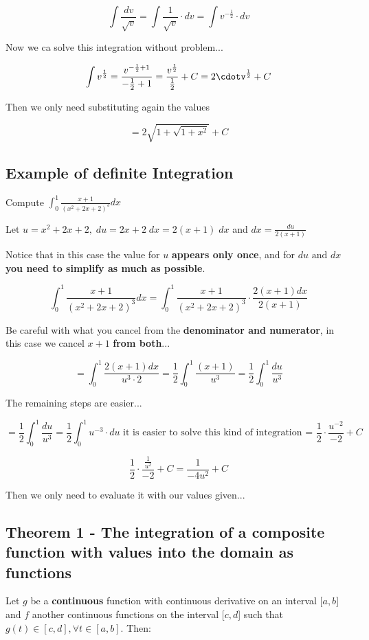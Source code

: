 \documentclass{article}
\begin{document}
\[\int \frac{dv}{\sqrt{v}} = \int \frac{1}{\sqrt{v}} \cdot dv = \int v^{-\frac{1}{2}} \cdot dv\]

Now we ca solve this integration without problem...

\[\int v^{\frac{1}{2}} = \frac{v^{-\frac{1}{2} + 1}}{-\frac{1}{2}+1} = \frac{v^{\frac{1}{2}}}{\frac{1}{2}} + C = 2\cdotv^{\frac{1}{2}} + C
\]

Then we only need substituting again the values

\[=2\sqrt{1+\sqrt{1+x^2}} + C\]

\subsection*{Example \textbf{of definite Integration}}
Compute \(\int_{0}^{1} \frac{x+1}{(x^2+2x+2)^3} dx\)

Let \(u = x^2+2x+2,\;du=2x+2\;dx = 2(x+1)\;dx\) and \(dx=\frac{du}{2(x+1)}\) 

Notice that in this case the value for \(u\) \textbf{appears only once}, and for \(du \text{ and } dx\) \textbf{you need to simplify as much as possible}.

\[
\int_{0}^{1} \frac{x+1}{(x^2+2x+2)^3} dx = \int_{0}^{1}\frac{x+1}{(x^2+2x+2)^3} \cdot \frac{2(x+1)dx}{2(x+1)}
\]

Be careful with what you cancel from the \textbf{denominator and numerator}, in this case we cancel \(x+1\) \textbf{from both}...

\[
= \int_{0}^{1} \frac{2(x+1)dx}{u^3\cdot 2} = \frac{1}{2} \int_{0}^{1} \frac{(x+1)}{u^3} = \frac{1}{2} \int_{0}^{1} \frac{du}{u^3}
\]

The remaining steps are easier...

\[= \frac{1}{2} \int_{0}^{1} \frac{du}{u^3} = \frac{1}{2} \int_{0}^{1} u^{-3} \cdot du \text{ it is easier to solve this kind of integration =  }\frac{1}{2}\cdot \frac{u^{-2}}{-2} + C
\]

\[
\frac{1}{2} \cdot \frac{\frac{1}{u^2}}{-2} + C = \frac{1}{-4u^2} +C
\]

Then we only need to evaluate it with our values given...

\subsection*{Theorem 1 - The integration of a composite function with values into the domain as functions}

Let \(g\) be a \textbf{continuous} function with continuous derivative on an interval [\(a,b\)] and \(f\) another continuous functions on the interval [\(c,d\)] such that \(g(t) \in [c,d], \forall t \in [a,b]\). Then:
\end{document}

